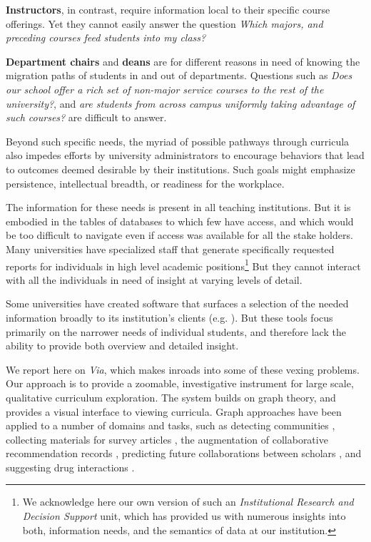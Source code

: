 {\bf Instructors}, in contrast, require information local to their
specific course offerings. Yet they cannot easily answer the question
{\it Which majors, and preceding courses feed students into my class?}

{\bf Department chairs} and {\bf deans} are for different reasons in
need of knowing the migration paths of students in and out of
departments. Questions such as {\it Does our school offer a rich set
  of non-major service courses to the rest of the university?}, and
{\it are students from across campus uniformly taking advantage of
  such courses?} are difficult to answer.

Beyond such specific needs, the myriad of possible pathways through
curricula also impedes efforts by university administrators to
encourage behaviors that lead to outcomes deemed desirable by
their institutions. Such goals might emphasize persistence,
intellectual breadth, or readiness for the workplace.

The information for these needs is present in all teaching
institutions. But it is embodied in the tables of databases to which
few have access, and which would be too difficult to navigate even if
access was available for all the stake holders. Many universities have
specialized staff that generate specifically requested reports for
individuals in high level academic positions\footnote{We acknowledge
  here our own version of such an {\it Institutional Research and
    Decision Support} unit, which has provided us with numerous
  insights into both, information needs, and the semantics of data at
  our institution.} But they cannot interact with all the individuals
in need of insight at varying levels of detail.

Some universities have created software that surfaces a selection of
the needed information broadly to its institution's clients
(e.g. \cite{carta}). But these tools focus primarily on the narrower
needs of individual students, and therefore lack the ability to
provide both overview and detailed insight.

We report here on {\it Via}, which makes inroads into some of these
vexing problems. Our approach is to provide a zoomable, investigative
instrument for large scale, qualitative curriculum exploration. The
system builds on graph theory, and provides a visual interface to
viewing curricula. Graph approaches have been applied to a number of
domains and tasks, such as detecting communities
\cite{PhysRevE.70.056104}, collecting materials for survey articles
\cite{ji2015}, the augmentation of collaborative recommendation
records \cite{huang2005}, predicting future collaborations between
scholars \cite{liben2007}, and suggesting drug interactions
\cite{zitnik2018}.

